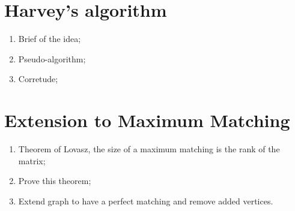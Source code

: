 \chapter{Harvey's algorithm}

\begin{enumerate}
    \item Brief of the idea;
    \item Pseudo-algorithm;
    \item Corretude;
\end{enumerate}

\chapter{Extension to Maximum Matching}

\begin{enumerate}
    \item Theorem of Lovasz, the size of a maximum matching is the rank of the matrix;
    \item Prove this theorem;
    \item Extend graph to have a perfect matching and remove added vertices.
\end{enumerate}